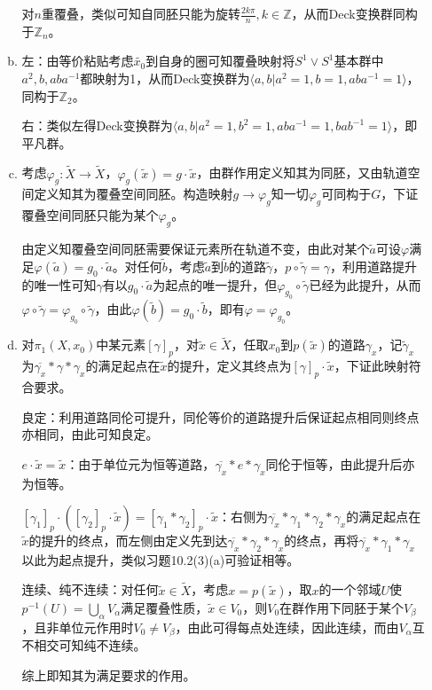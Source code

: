 \documentclass[a4paper,UTF8,fontset=windows]{ctexart}
\begin{document}
\begin{enumerate}[(1)]
\begin{enumerate}[(a)]
    对$n$重覆叠，类似可知自同胚只能为旋转$\frac{2k\pi}{n},k\in\mathbb{Z}$，从而Deck变换群同构于$\mathbb{Z}_n$。
    
    \item
    左：由等价粘贴考虑$\tilde{x_0}$到自身的圈可知覆叠映射将$S^1\vee S^1$基本群中$a^2,b,aba^{-1}$都映射为1，从而Deck变换群为$\langle a,b|a^2=1,b=1,aba^{-1}=1\rangle$，同构于$\mathbb{Z}_2$。
    
    右：类似左得Deck变换群为$\langle a,b|a^2=1,b^2=1,aba^{-1}=1,bab^{-1}=1\rangle$，即平凡群。
    
    \item
    考虑$\varphi_g:\tilde{X}\to\tilde{X}$，$\varphi_g(\tilde{x})=g\cdot\tilde{x}$，由群作用定义知其为同胚，又由轨道空间定义知其为覆叠空间同胚。构造映射$g\to\varphi_g$知一切$\varphi_g$可同构于$G$，下证覆叠空间同胚只能为某个$\varphi_g$。
    
    由定义知覆叠空间同胚需要保证元素所在轨道不变，由此对某个$\tilde{a}$可设$\varphi$满足$\varphi(\tilde{a})=g_0\cdot\tilde{a}$。对任何$\tilde{b}$，考虑$\tilde{a}$到$\tilde{b}$的道路$\tilde{\gamma}$，$p\circ\tilde{\gamma}=\gamma$，利用道路提升的唯一性可知$\gamma$有以$g_0\cdot\tilde{a}$为起点的唯一提升，但$\varphi_{g_0}\circ\tilde{\gamma}$已经为此提升，从而$\varphi\circ\tilde{\gamma}=\varphi_{g_0}\circ\tilde{\gamma}$，由此$\varphi(\tilde{b})=g_0\cdot\tilde{b}$，即有$\varphi=\varphi_{g_0}$。
    
    \item
    对$\pi_1(X,x_0)$中某元素$[\gamma]_p$，对$\tilde{x}\in\tilde{X}$，任取$x_0$到$p(\tilde{x})$的道路$\gamma_x$，记$\tilde{\gamma}_x$为$\overline{\gamma_x}*\gamma*\gamma_x$的满足起点在$\tilde{x}$的提升，定义其终点为$[\gamma]_p\cdot\tilde{x}$，下证此映射符合要求。
    
    良定：利用道路同伦可提升，同伦等价的道路提升后保证起点相同则终点亦相同，由此可知良定。
    
    $e\cdot\tilde{x}=\tilde{x}$：由于单位元为恒等道路，$\overline{\gamma_x}*e*\gamma_x$同伦于恒等，由此提升后亦为恒等。
    
    $[\gamma_1]_p\cdot([\gamma_2]_p\cdot\tilde{x})=[\gamma_1*\gamma_2]_p\cdot\tilde{x}$：右侧为$\overline{\gamma_x}*\gamma_1*\gamma_2*\gamma_x$的满足起点在$\tilde{x}$的提升的终点，而左侧由定义先到达$\overline{\gamma_x}*\gamma_2*\gamma_x$的终点，再将$\overline{\gamma_x}*\gamma_1*\gamma_x$以此为起点提升，类似习题10.2(3)(a)可验证相等。
    
    连续、纯不连续：对任何$\tilde{x}\in\tilde{X}$，考虑$x=p(\tilde{x})$，取$x$的一个邻域$U$使$p^{-1}(U)=\bigcup_\alpha V_\alpha$满足覆叠性质，$\tilde{x}\in V_0$，则$V_0$在群作用下同胚于某个$V_\beta$，且非单位元作用时$V_0\ne V_\beta$，由此可得每点处连续，因此连续，而由$V_\alpha$互不相交可知纯不连续。
    
    综上即知其为满足要求的作用。
    \end{enumerate}
\end{enumerate}
\end{document}
